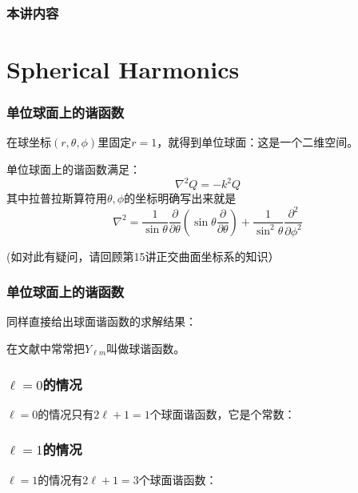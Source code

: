 \documentclass[CJK]{beamer}
\date{}
\begin{document}
  \bch
{}

\begin{frame}
\frametitle{本讲内容}

\tableofcontents
\end{frame}


\section{Spherical Harmonics}


\begin{frame}
\frametitle{单位球面上的谐函数}

在球坐标$(r,\theta,\phi)$里固定$r=1$，就得到单位球面：这是一个二维空间。

\skipline

单位球面上的谐函数满足：
$$ \nabla^2Q = -k^2Q $$
其中拉普拉斯算符用$\theta,\phi$的坐标明确写出来就是
$$ \nabla^2 = \frac{1}{\sin\theta}\frac{\partial}{\partial\theta}\left(\sin\theta\frac{\partial}{\partial\theta}\right) + \frac{1}{\sin^2\theta}\frac{\partial^2}{\partial\phi^2} $$

{\scriptsize (如对此有疑问，请回顾第15讲正交曲面坐标系的知识）}

\end{frame}



\begin{frame}
\frametitle{单位球面上的谐函数}

同样直接给出球面谐函数的求解结果：
\skiplines
{}

在文献中常常把$Y_{\ell m}$叫做{\blue 球谐函数}。


\end{frame}




\begin{frame}
\frametitle{$\ell = 0$的情况}

$\ell = 0$的情况只有$2\ell+1=1$个球面谐函数，它是个常数：



\end{frame}



\begin{frame}
\frametitle{$\ell = 1$的情况}

$\ell = 1$的情况有$2\ell+1=3$个球面谐函数：


\end{frame}
\end{document}
